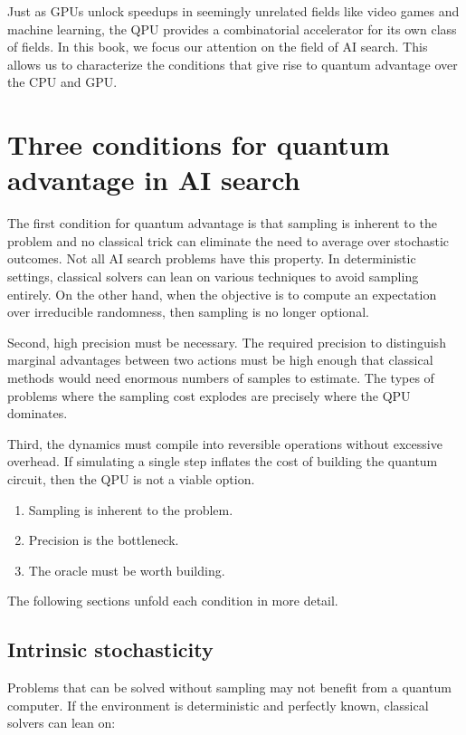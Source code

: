 Just as GPUs unlock speedups in seemingly unrelated fields like video games and machine learning, the QPU provides a combinatorial accelerator for its own class of fields.
In this book, we focus our attention on the field of AI search.
This allows us to characterize the conditions that give rise to quantum advantage over the CPU and GPU.

\section{Three conditions for quantum advantage in AI search}

The first condition for quantum advantage is that sampling is inherent to the problem and no classical trick can eliminate the need to average over stochastic outcomes.
Not all AI search problems have this property.
In deterministic settings, classical solvers can lean on various techniques to avoid sampling entirely.
On the other hand, when the objective is to compute an expectation over irreducible randomness, then sampling is no longer optional.

Second, high precision must be necessary.
The required precision to distinguish marginal advantages between two actions must be high enough that classical methods would need enormous numbers of samples to estimate.
The types of problems where the sampling cost explodes are precisely where the QPU dominates.

Third, the dynamics must compile into reversible operations without excessive overhead.
If simulating a single step inflates the cost of building the quantum circuit, then the QPU is not a viable option.

\begin{enumerate}
  \item Sampling is inherent to the problem.
  \item Precision is the bottleneck.
  \item The oracle must be worth building.
\end{enumerate}

The following sections unfold each condition in more detail.

\subsection{Intrinsic stochasticity}

Problems that can be solved without sampling may not benefit from a quantum computer.
If the environment is deterministic and perfectly known, classical solvers can lean on:

